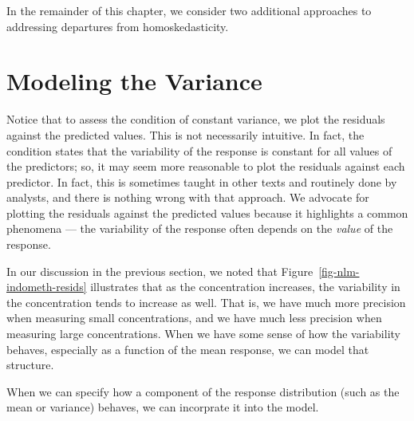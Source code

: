 \documentclass[
  letterpaper,
  DIV=11,
  numbers=noendperiod]{scrreprt}
\theoremstyle{definition}
\theoremstyle{definition}
\theoremstyle{remark}
\begin{document}
In the remainder of this chapter, we consider two additional approaches
to addressing departures from homoskedasticity.

\hypertarget{modeling-the-variance}{%
\section{Modeling the Variance}\label{modeling-the-variance}}

Notice that to assess the condition of constant variance, we plot the
residuals against the predicted values. This is not necessarily
intuitive. In fact, the condition states that the variability of the
response is constant for all values of the predictors; so, it may seem
more reasonable to plot the residuals against each predictor. In fact,
this is sometimes taught in other texts and routinely done by analysts,
and there is nothing wrong with that approach. We advocate for plotting
the residuals against the predicted values because it highlights a
common phenomena --- the variability of the response often depends on
the \emph{value} of the response.

In our discussion in the previous section, we noted that
Figure~\ref{fig-nlm-indometh-resids} illustrates that as the
concentration increases, the variability in the concentration tends to
increase as well. That is, we have much more precision when measuring
small concentrations, and we have much less precision when measuring
large concentrations. When we have some sense of how the variability
behaves, especially as a function of the mean response, we can model
that structure.

\begin{tcolorbox}[enhanced jigsaw, left=2mm, toprule=.15mm, arc=.35mm, breakable, opacitybacktitle=0.6, opacityback=0, rightrule=.15mm, colbacktitle=quarto-callout-tip-color!10!white, coltitle=black, leftrule=.75mm, toptitle=1mm, colframe=quarto-callout-tip-color-frame, titlerule=0mm, title=\textcolor{quarto-callout-tip-color}{\faLightbulb}\hspace{0.5em}{Big Idea}, bottomrule=.15mm, colback=white, bottomtitle=1mm]

When we can specify how a component of the response distribution (such
as the mean or variance) behaves, we can incorprate it into the model.

\end{tcolorbox}
\end{document}

